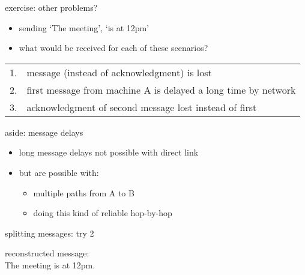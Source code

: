 \begin{frame}{exercise: other problems?}
\begin{itemize}
\item sending `The meeting', `is at 12pm'
\item what would be received for each of these scenarios?
\end{itemize}
\begin{tabular}{ll}
1. & message (instead of acknowledgment) is lost \\
2. & first message from machine A is delayed a long time by network \\
3. & acknowledgment of second message lost instead of first \\
\end{tabular}
\end{frame}

\begin{frame}{aside: message delays}
    \begin{itemize}
    \item long message delays not possible with direct link
    \vspace{.5cm}
    \item but are possible with:
        \begin{itemize}
        \item multiple paths from A to B
        \item doing this kind of reliable hop-by-hop
        \end{itemize}
    \end{itemize}
\end{frame}

\begin{frame}{splitting messages: try 2}
reconstructed message: \\
The meeting is at 12pm.
\end{frame}

